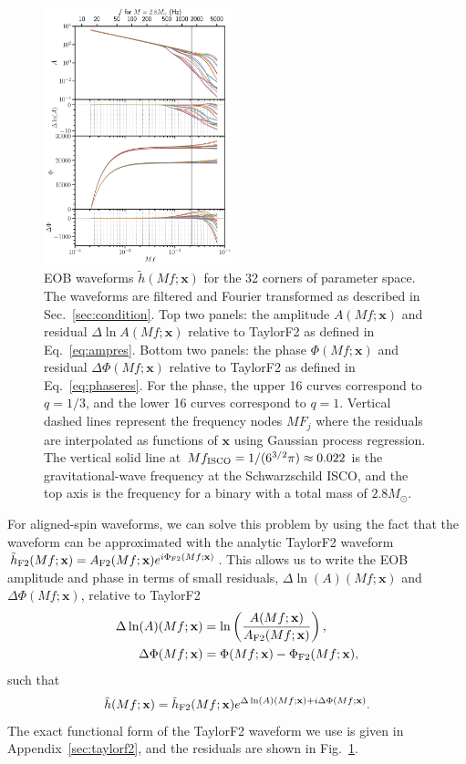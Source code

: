\documentclass[prd,aps,letter,twocolumn,floatfix,notitlepage,nofootinbib]{revtex4-1}
\def\bx{\mathbf{x}}
\begin{document}
\begin{figure}[htb]
\centering
\includegraphics[width=0.49\textwidth]{hoff.pdf}
\caption{EOB waveforms $\tilde h(Mf; \bx)$ for the 32 corners of parameter space. The waveforms are filtered and Fourier transformed as described in Sec.~\ref{sec:condition}. Top two panels: the amplitude $A(Mf; \bx)$ and residual $\Delta\ln A(Mf; \bx)$ relative to TaylorF2 as defined in Eq.~\eqref{eq:ampres}. Bottom two panels: the phase $\Phi(Mf; \bx)$ and residual $\Delta\Phi(Mf; \bx)$ relative to TaylorF2 as defined in Eq.~\eqref{eq:phaseres}. For the phase, the upper 16 curves correspond to $q=1/3$, and the lower 16 curves correspond to $q=1$. Vertical dashed lines represent the frequency nodes $MF_j$ where the residuals are interpolated as functions of $\bx$ using Gaussian process regression. The vertical solid line at $Mf_{\rm ISCO} = 1/(6^{3/2}\pi) \approx 0.022$ is the gravitational-wave frequency at the Schwarzschild ISCO, and the top axis is the frequency for a binary with a total mass of $2.8M_\odot$.}
\label{fig:hoff}
\end{figure}

For aligned-spin waveforms, we can solve this problem by using the fact that the waveform can be approximated with the analytic TaylorF2 waveform $\tilde h_{\rm F2}(Mf; \bx) = A_{\rm F2}(Mf; \bx) e^{i\Phi_{\rm F2} (Mf; \bx)}$. This allows us to write the EOB amplitude and phase in terms of small residuals, $\Delta\ln(A)(Mf; \bx)$ and $\Delta\Phi(Mf; \bx)$, relative to TaylorF2
\begin{align}
\Delta\ln(A)(Mf; \bx) &= \ln\left(\frac{ A(Mf; \bx) }{ A_{\rm F2}(Mf; \bx)}\right), \label{eq:ampres}\\
\Delta\Phi(Mf; \bx) & = \Phi(Mf; \bx) - \Phi_{\rm F2}(Mf; \bx), \label{eq:phaseres}
\end{align}
such that
\begin{align}
\tilde h(Mf; \bx) = \tilde h_{\rm F2}(Mf; \bx) e^{\Delta\ln(A)(Mf; \bx) + i  \Delta\Phi(Mf; \bx)}.
\label{eq:hdecomp}
\end{align}
The exact functional form of the TaylorF2 waveform we use is given in Appendix~\ref{sec:taylorf2}, and the residuals are shown in Fig.~\ref{fig:hoff}. 
\end{document}
